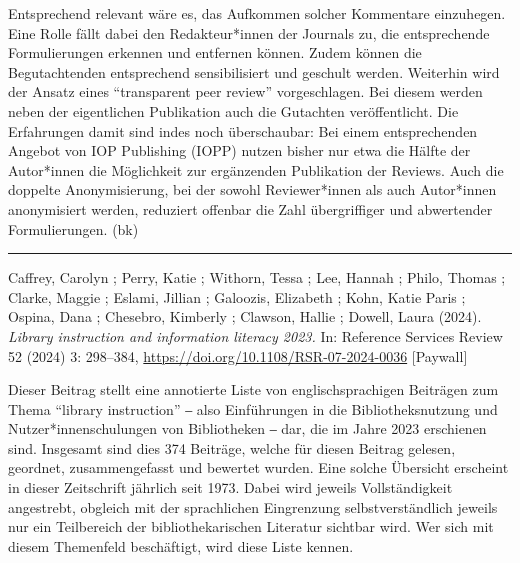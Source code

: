 \documentclass[a4paper,
fontsize=11pt,
oneside,
numbers=noperiodatend,
parskip=half-,
bibliography=totoc,
final
]{scrartcl}
\begin{document}
Entsprechend relevant wäre es, das Aufkommen solcher Kommentare
einzuhegen. Eine Rolle fällt dabei den Redakteur*innen der Journals zu,
die entsprechende Formulierungen erkennen und entfernen können. Zudem
können die Begutachtenden entsprechend sensibilisiert und geschult
werden. Weiterhin wird der Ansatz eines \enquote{transparent peer
review} vorgeschlagen. Bei diesem werden neben der eigentlichen
Publikation auch die Gutachten veröffentlicht. Die Erfahrungen damit
sind indes noch überschaubar: Bei einem entsprechenden Angebot von IOP
Publishing (IOPP) nutzen bisher nur etwa die Hälfte der Autor*innen die
Möglichkeit zur ergänzenden Publikation der Reviews. Auch die doppelte
Anonymisierung, bei der sowohl Reviewer*innen als auch Autor*innen
anonymisiert werden, reduziert offenbar die Zahl übergriffiger und
abwertender Formulierungen. (bk)

\begin{center}\rule{0.5\linewidth}{0.5pt}\end{center}

Caffrey, Carolyn ; Perry, Katie ; Withorn, Tessa ; Lee, Hannah ; Philo,
Thomas ; Clarke, Maggie ; Eslami, Jillian ; Galoozis, Elizabeth ; Kohn,
Katie Paris ; Ospina, Dana ; Chesebro, Kimberly ; Clawson, Hallie ;
Dowell, Laura (2024). \emph{Library instruction and information literacy
2023.} In: Reference Services Review 52 (2024) 3: 298--384,
\url{https://doi.org/10.1108/RSR-07-2024-0036} {[}Paywall{]}

Dieser Beitrag stellt eine annotierte Liste von englischsprachigen
Beiträgen zum Thema \enquote{library instruction} ‒ also Einführungen in
die Bibliotheksnutzung und Nutzer*innenschulungen von Bibliotheken ‒
dar, die im Jahre 2023 erschienen sind. Insgesamt sind dies 374
Beiträge, welche für diesen Beitrag gelesen, geordnet, zusammengefasst
und bewertet wurden. Eine solche Übersicht erscheint in dieser
Zeitschrift jährlich seit 1973. Dabei wird jeweils Vollständigkeit
angestrebt, obgleich mit der sprachlichen Eingrenzung selbstverständlich
jeweils nur ein Teilbereich der bibliothekarischen Literatur sichtbar
wird. Wer sich mit diesem Themenfeld beschäftigt, wird diese Liste
kennen.
\end{document}
